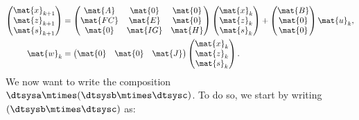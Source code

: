 \begin{equation*}
    \label{eq:dlin-5}
    \begin{aligned}
        \begin{pmatrix}
            \mat{x}_{k+1} \\
            \mat{z}_{k+1} \\
            \mat{s}_{k+1}
        \end{pmatrix} & =
        \begin{pmatrix}
            \mat{A}  & \mat{0}  & \mat{0} \\
            \mat{FC} & \mat{E}  & \mat{0} \\
            \mat{0}  & \mat{IG} & \mat{H}
        \end{pmatrix}
        \begin{pmatrix}
            \mat{x}_k \\ \mat{z}_k\\ \mat{s}_k
        \end{pmatrix}+
        \begin{pmatrix}
            \mat{B} \\ \mat{0}\\ \mat{0}
        \end{pmatrix}\mat{u}_k, \\
        \mat{w}_k                         & =
        \begin{pmatrix}
            \mat{0} & \mat{0} & \mat{J}
        \end{pmatrix}
        \begin{pmatrix}
            \mat{x}_k \\ \mat{z}_k\\ \mat{s}_k
        \end{pmatrix}.
    \end{aligned}
\end{equation*}
We now want to write the composition~$\dtsysa\mtimes (\dtsysb\mtimes \dtsysc)$.
To do so, we start by writing~$(\dtsysb\mtimes \dtsysc)$ as:
